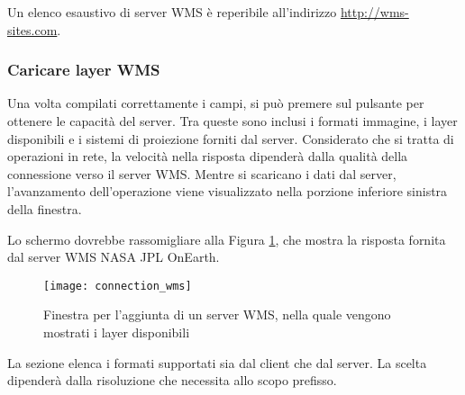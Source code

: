 Un elenco esaustivo di server WMS è reperibile all'indirizzo \url{http://wms-sites.com}.

\subsubsection{Caricare layer WMS}\label{sec:ogc-wms-layers}

Una volta compilati correttamente i campi, si può premere sul pulsante
 per ottenere le capacità del server. Tra queste sono inclusi
i formati immagine, i layer disponibili e i sistemi di proiezione forniti dal
server. Considerato che si tratta di operazioni in rete, la velocità nella
risposta dipenderà dalla qualità della connessione verso il server WMS. Mentre
si scaricano i dati dal server, l'avanzamento dell'operazione viene
visualizzato nella porzione inferiore sinistra della finestra. 

Lo schermo dovrebbe rassomigliare alla Figura \ref{fig:connection_wms}, che
mostra la risposta fornita dal server WMS NASA JPL OnEarth.

\begin{figure}[ht]
  \begin{center}
  	\caption{Finestra per l'aggiunta di un server WMS, nella quale vengono
	mostrati i layer disponibili \nixcaption}\label{fig:connection_wms}
	\texttt{[image: connection\_wms]}
  \end{center}
\end{figure}


La sezione  elenca i formati supportati sia dal client
che dal  server. La scelta dipenderà dalla risoluzione che necessita allo scopo
prefisso.

\begin{Tip}[ht]\caption{\textsc{Codifica immagine}}
\end{Tip}

